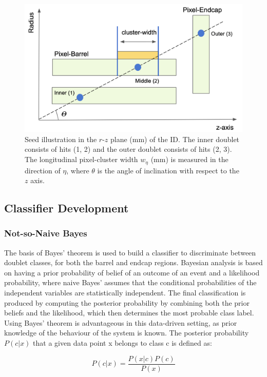 \begin{figure}[!htbp]
\centering
    \includegraphics[width=0.8\linewidth]{images/4-ml-based-predictor/triplet_illustation.png}
    \caption{Seed illustration in the $r$-$z$ plane (mm) of the ID. The inner doublet consists of hits (1, 2) and the outer doublet consists of hits (2, 3). The longitudinal pixel-cluster width $w_{\eta}$ (mm) is measured in the direction of $\eta$, where $\theta$ is the angle of inclination with respect to the $z$ axis.}
\label{fig:triplet-illustration}
\end{figure}


\subsection{Classifier Development}

\subsubsection{Not-so-Naive Bayes}

The basis of Bayes’ theorem \cite{naive-bayes} is used to build a classifier to discriminate between doublet classes, for both the barrel and endcap regions. Bayesian analysis is based on having a prior probability of belief of an outcome of an event and a likelihood probability, where naive Bayes’ assumes that the conditional probabilities of the independent variables are statistically independent. The final classification is produced by computing the posterior probability by combining both the prior beliefs and the likelihood, which then determines the most probable class label. Using Bayes’ theorem is advantageous in this data-driven setting, as prior knowledge of the behaviour of the system is known. The posterior probability $P(c|x)$ that a given data point x belongs to class c is defined as:

\begin{equation} \label{naive-bayes}
    P(c|x) = \frac{P(x|c)P(c)}{P(x)}
\end{equation}

